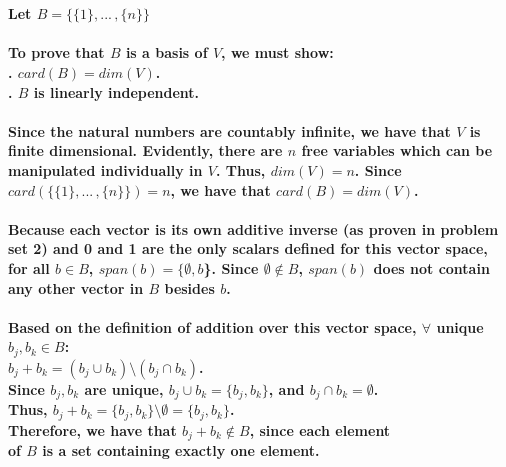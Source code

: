 \documentclass{article}
\begin{document}
\paragraph{\large
\\Let $B = \{\{1\},...\,, \{n\}\}$}

\paragraph{\large
To prove that $B$ is a basis of $V$, we must show:
\\. $card(B) = dim(V)$.
\\. $B$ is linearly independent.}

\paragraph{\large
Since the natural numbers are countably infinite, we have that $V$ is finite dimensional. Evidently, there are $n$ free variables which can be manipulated individually in $V$. Thus, $dim(V) = n$. Since $card(\{\{1\},...\,, \{n\}\}) = n$, we have that $card(B) = dim(V)$.}

\paragraph{\large
Because each vector is its own additive inverse (as proven in problem set 2) and 0 and 1 are the only scalars defined for this vector space, for all $b \in B$, $span(b) = \{\emptyset, b$\}. Since $\emptyset \notin B$, $span(b)$ does not contain any other vector in $B$ besides $b$.}

\paragraph{\large
Based on the definition of addition over this vector space, $\forall$ unique $b_j,b_k \in B$:
\\\indent $b_j + b_k = (b_j \cup b_k) \setminus (b_j \cap b_k)$.
\\\indent Since $b_j,b_k$ are unique, $b_j \cup b_k = \{b_j, b_k\}$, and $b_j \cap b_k = \emptyset$.
\\\indent Thus, $b_j + b_k = \{b_j, b_k\} \setminus \emptyset = \{b_j, b_k\}$.
\\\indent Therefore, we have that $b_j + b_k \notin B$, since each element 
\\\indent of $B$ is a set containing exactly one element.}
\end{document}
